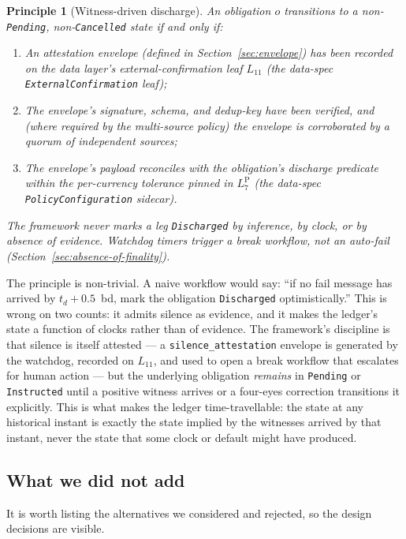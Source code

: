 \documentclass[11pt,a4paper]{article}
\newtheorem{principle}[definition]{Principle}
\begin{document}
\begin{principle}[Witness-driven discharge]
\label{prin:witness}
An obligation $o$ transitions to a non-\texttt{Pending}, non-\texttt{Cancelled} state if and only if:
\begin{enumerate}[nosep]
\item An \emph{attestation envelope} (defined in Section~\ref{sec:envelope}) has been recorded on the data layer's external-confirmation leaf $L_{11}$ (the data-spec \texttt{ExternalConfirmation} leaf);
\item The envelope's signature, schema, and dedup-key have been verified, and (where required by the multi-source policy) the envelope is corroborated by a quorum of independent sources;
\item The envelope's payload reconciles with the obligation's discharge predicate within the per-currency tolerance pinned in $L_7^{\mathrm{P}}$ (the data-spec \texttt{PolicyConfiguration} sidecar).
\end{enumerate}
The framework \emph{never} marks a leg \texttt{Discharged} by inference, by clock, or by absence of evidence. Watchdog timers trigger a break workflow, not an auto-fail (Section~\ref{sec:absence-of-finality}).
\end{principle}

The principle is non-trivial. A naive workflow would say: ``if no fail message has arrived by $t_d + 0.5$~bd, mark the obligation \texttt{Discharged} optimistically.'' This is wrong on two counts: it admits silence as evidence, and it makes the ledger's state a function of clocks rather than of evidence. The framework's discipline is that silence is itself attested --- a \texttt{silence\_attestation} envelope is generated by the watchdog, recorded on $L_{11}$, and used to open a break workflow that escalates for human action --- but the underlying obligation \emph{remains} in \texttt{Pending} or \texttt{Instructed} until a positive witness arrives or a four-eyes correction transitions it explicitly. This is what makes the ledger time-travellable: the state at any historical instant is exactly the state implied by the witnesses arrived by that instant, never the state that some clock or default might have produced.

\subsection{What we did not add}

It is worth listing the alternatives we considered and rejected, so the design decisions are visible.
\end{document}
